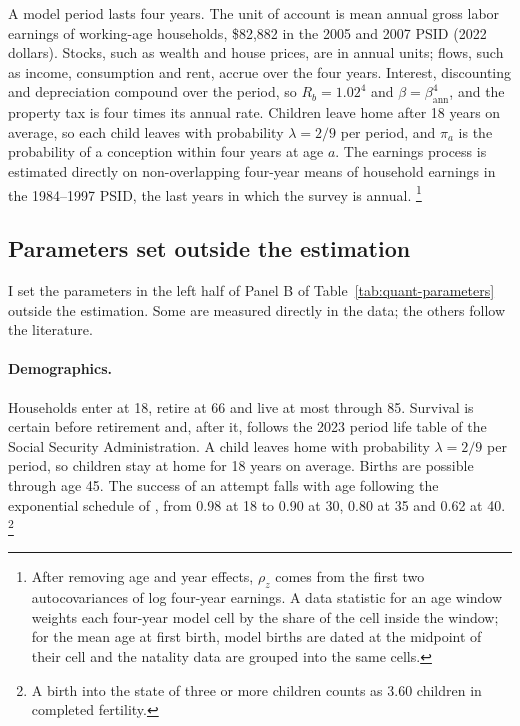 A model period lasts four years. The unit of account is mean annual gross
labor earnings of working-age households, \$82,882 in the 2005 and 2007 PSID
(2022 dollars). Stocks, such as wealth and house prices, are in annual units;
flows, such as income, consumption and rent, accrue over the four years.
Interest, discounting and depreciation compound over the period, so
$R_b=1.02^4$ and $\beta=\beta_{\text{ann}}^4$, and the property tax is four
times its annual rate. Children leave home after 18 years on average, so each
child leaves with probability $\lambda=2/9$ per period, and $\pi_a$ is the
probability of a conception within four years at age $a$.
The earnings process is estimated directly on non-overlapping four-year
means of household earnings in the 1984--1997 PSID, the last years in which
the survey is annual.%
\footnote{After removing age and year effects, $\rho_z$ comes from the first
two autocovariances of log four-year earnings. A data statistic for an age
window weights each four-year model cell by the share of the cell inside the
window; for the mean age at first birth, model births are dated at the
midpoint of their cell and the natality data are grouped into the same
cells.}

\subsection{Parameters set outside the estimation}

I set the parameters in the left half of Panel B of
Table~\ref{tab:quant-parameters} outside the estimation. Some are measured
directly in the data; the others follow the literature.

\paragraph{Demographics.}
Households enter at 18, retire at 66 and live at most through 85. Survival
is certain before retirement and, after it, follows the 2023 period life
table of the Social Security Administration. A child leaves home with
probability $\lambda=2/9$ per period, so children stay at home for 18 years
on average. Births are possible through age 45. The success of an attempt
falls with age following the exponential schedule of
\citet{sommerFertilityChoiceLife2016}, from 0.98 at 18 to 0.90 at 30, 0.80
at 35 and 0.62 at 40.%
\footnote{A birth into the state of three or more children counts as 3.60
children in completed fertility.}

